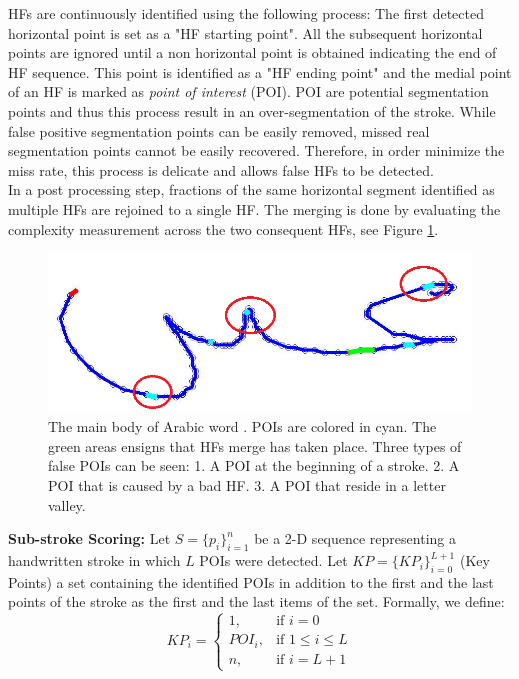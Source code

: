 \documentclass[10pt, conference, compsocconf]{IEEEtran}
\begin{document}
HFs are continuously identified using the following process: 
The first detected horizontal point is set as a "HF starting point". 
All the subsequent horizontal points are ignored until a non horizontal point is obtained indicating the end of HF sequence. 
This point is identified as a "HF ending point" and the medial point of an HF is marked as \emph{point of interest} (POI). 
POI are potential segmentation points and thus this process result in an over-segmentation of the stroke. 
While false positive segmentation points can be easily removed, missed real segmentation points cannot be easily recovered. 
Therefore, in order minimize the miss rate, this process is delicate and allows false HFs to be detected.\\

In a post processing step, fractions of the same horizontal segment identified as multiple HFs are rejoined to a single HF. 
The merging is done by evaluating the complexity measurement across the two consequent HFs, see Figure \ref{fig:candidate_in_no_horizontal}.\\

\begin{figure}
\centering
\includegraphics[width=0.4\columnwidth]{./figures/candidate_in_no_horizontal}
\caption{The main body of Arabic word . POIs are colored in cyan. The green areas ensigns that HFs merge has taken place. Three types of false POIs can be seen: 1. A POI at the beginning of a stroke. 2. A POI that is caused by a bad HF. 3. A POI that reside in a letter valley. }
\label{fig:candidate_in_no_horizontal}
\end{figure}

\textbf{Sub-stroke Scoring:}
Let $S=\{p_{i}\}_{i=1}^{n}$ be a 2-D sequence representing a handwritten stroke in which $L$ POIs were detected. 
Let $KP=\{KP_{i}\}_{i=0}^{L+1}$ (Key Points) a set containing the identified POIs in addition to the first and the last points of the stroke as the first and the last items of the set.
Formally, we define: 
\begin{equation}
KP_{i} =\begin{cases}    1		, & \mbox{if } i=0 \\
							   POI_{i}	, & \mbox{if } 1\leq i \leq L \\
							   n    , & \mbox{if } i=L+1 
			\end{cases}				
\end{equation}
\end{document}

